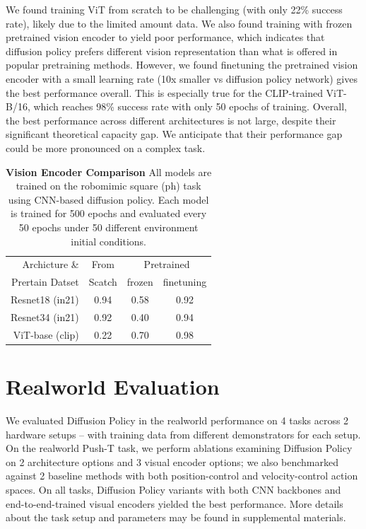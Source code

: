 We found training ViT from scratch to be challenging (with only 22\% success rate), likely due to the limited amount data.
We also found training with frozen pretrained vision encoder to yield poor performance, which indicates that diffusion policy prefers different vision representation than what is offered in popular pretraining methods.
However, we found finetuning the pretrained vision encoder with a small learning rate (10x smaller vs diffusion policy network) gives the best performance overall. This is especially true for the CLIP-trained ViT-B/16, which reaches 98\% success rate with only 50 epochs of training.
Overall, the best performance across different architectures is not large, despite their significant theoretical capacity gap. We anticipate that their performance gap could be more pronounced on a complex task.

\begin{table}
\centering
\begin{tabular}{r|c|cc}
\toprule
Archicture \& & From & \multicolumn{2}{c}{Pretrained} \\
Prertain Datset& Scatch & frozen & finetuning \\
\midrule
Resnet18 (in21) & 0.94   & 0.58      & 0.92             \\
Resnet34 (in21)& 0.92   & 0.40      & 0.94             \\
ViT-base (clip)& 0.22   & 0.70      & 0.98             \\
\bottomrule
\end{tabular}
\caption{\textbf{Vision Encoder Comparison} All models are trained on the robomimic square (ph) task using CNN-based diffusion policy. Each model is trained for 500 epochs and evaluated every 50 epochs under 50 different environment initial conditions.}
\label{tab:ablation_vision_encorder} 
\vspace{-2mm}
\end{table}


\section{Realworld Evaluation}
We evaluated Diffusion Policy in the realworld performance on 4 tasks across 2 hardware setups -- with training data from different demonstrators for each setup. On the realworld Push-T task, we perform ablations examining Diffusion Policy on 2 architecture options and 3 visual encoder options; we also benchmarked against 2 baseline methods with both position-control and velocity-control action spaces. On all tasks, Diffusion Policy variants with both CNN backbones and end-to-end-trained visual encoders yielded the best performance. More details about the task setup and parameters may be found in supplemental materials.

